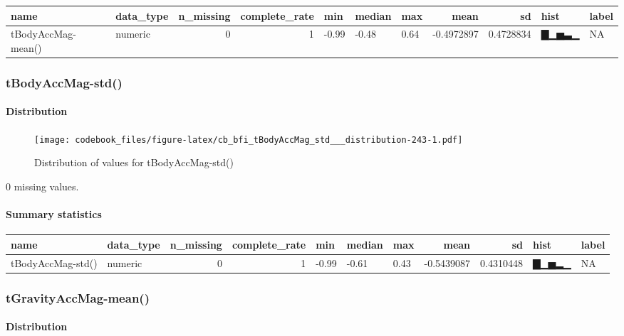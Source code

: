 \documentclass[
]{article}
\begin{document}
\begin{longtable}[]{@{}llrrlllrrll@{}}
\toprule
name & data\_type & n\_missing & complete\_rate & min & median & max &
mean & sd & hist & label \\
\midrule
\endhead
tBodyAccMag-mean() & numeric & 0 & 1 & -0.99 & -0.48 & 0.64 & -0.4972897
& 0.4728834 & ▇▁▅▃▁ & NA \\
\bottomrule
\end{longtable}

\hypertarget{tBodyAccMag_std__}{%
\subsubsection{tBodyAccMag-std()}\label{tBodyAccMag_std__}}

\hypertarget{tBodyAccMag_std___distribution}{%
\paragraph{Distribution}\label{tBodyAccMag_std___distribution}}

\begin{figure}
\centering
\texttt{[image: codebook\_files/figure-latex/cb\_bfi\_tBodyAccMag\_std\_\_\_distribution-243-1.pdf]}
\caption{Distribution of values for tBodyAccMag-std()}
\end{figure}

0 missing values.

\hypertarget{tBodyAccMag_std___summary}{%
\paragraph{Summary statistics}\label{tBodyAccMag_std___summary}}

\begin{longtable}[]{@{}llrrlllrrll@{}}
\toprule
name & data\_type & n\_missing & complete\_rate & min & median & max &
mean & sd & hist & label \\
\midrule
\endhead
tBodyAccMag-std() & numeric & 0 & 1 & -0.99 & -0.61 & 0.43 & -0.5439087
& 0.4310448 & ▇▁▅▂▁ & NA \\
\bottomrule
\end{longtable}

\hypertarget{tGravityAccMag_mean__}{%
\subsubsection{tGravityAccMag-mean()}\label{tGravityAccMag_mean__}}

\hypertarget{tGravityAccMag_mean___distribution}{%
\paragraph{Distribution}\label{tGravityAccMag_mean___distribution}}
\end{document}
